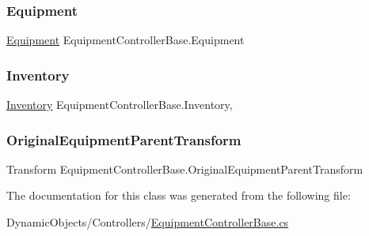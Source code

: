 \subsubsection{\texorpdfstring{Equipment}{Equipment}}
{\footnotesize\ttfamily \mbox{\hyperlink{class_equipment}{Equipment}} Equipment\+Controller\+Base.\+Equipment\hspace{0.3cm}{\ttfamily [get]}}

\mbox{\label{class_equipment_controller_base_a170ba5776e92e8968f26805a9c3c3eb2}} 
\subsubsection{\texorpdfstring{Inventory}{Inventory}}
{\footnotesize\ttfamily \mbox{\hyperlink{class_inventory}{Inventory}} Equipment\+Controller\+Base.\+Inventory\hspace{0.3cm}{\ttfamily [get]}, {\ttfamily [protected]}}

\mbox{\label{class_equipment_controller_base_a15d98115cdcca7c633694d14a22248f3}} 
\subsubsection{\texorpdfstring{Original\+Equipment\+Parent\+Transform}{OriginalEquipmentParentTransform}}
{\footnotesize\ttfamily Transform Equipment\+Controller\+Base.\+Original\+Equipment\+Parent\+Transform\hspace{0.3cm}{\ttfamily [get]}}



The documentation for this class was generated from the following file\+:\begin{DoxyCompactItemize}
\item 
Dynamic\+Objects/\+Controllers/\mbox{\hyperlink{_equipment_controller_base_8cs}{Equipment\+Controller\+Base.\+cs}}\end{DoxyCompactItemize}

